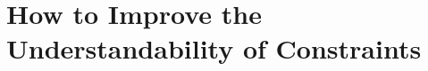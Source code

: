 \documentclass{llncs}
\newenvironment{DL}{
  \vspace{0cm}
	\begin{center}
  \begin{tabular}{r l}

}{
  \end{tabular}
	\end{center}
}
\begin{document}
{%

%
%
%

\section{How to Improve the Understandability of Constraints}
\label{sec:transformations}

}
\end{document}
